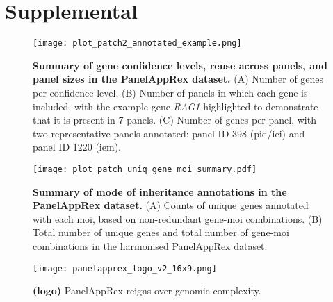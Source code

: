 

\clearpage

\beginsupplement
\section{Supplemental} \label{Supplemental_text}

\begin{figure}[ht]
    \centering
    \texttt{[image: plot\_patch2\_annotated\_example.png]}    
\caption{\textbf{Summary of gene confidence levels, reuse across panels, and panel sizes in the PanelAppRex dataset.}
(A) Number of genes per confidence level. 
(B) Number of panels in which each gene is included, with the example gene \textit{RAG1} highlighted to demonstrate that it is present in 7 panels. 
(C) Number of genes per panel, with two representative panels annotated: panel ID 398 (\ac{pid}/\ac{iei}) and panel ID 1220 (\ac{iem}).
}
    \label{fig:summary_stats}
\end{figure}


\begin{figure}[ht]
    \centering
    \texttt{[image: plot\_patch\_uniq\_gene\_moi\_summary.pdf]}
\caption{\textbf{Summary of mode of inheritance annotations in the PanelAppRex dataset.}
(A) Counts of unique genes annotated with each \ac{moi}, based on non-redundant gene-\ac{moi} combinations.
(B) Total number of unique genes and total number of gene-\ac{moi} combinations in the harmonised PanelAppRex dataset.
}
    \label{fig:uniq_gene_moi}
\end{figure}

\begin{figure}[ht]
    \centering
    \texttt{[image: panelapprex\_logo\_v2\_16x9.png]}
\caption{\textbf{(logo)} PanelAppRex reigns over genomic complexity.
}
    \label{fig:uniq_gene_moi}
\end{figure}


